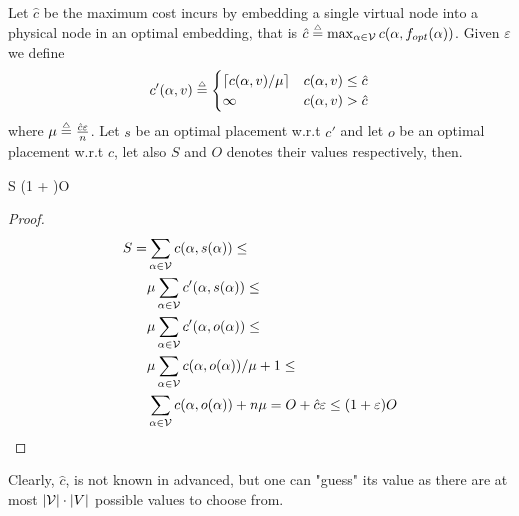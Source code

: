 Let $\hat{c}$ be the maximum cost incurs by embedding a single virtual node into 
a physical node in an optimal embedding, 
that is $\hat{c} \stackrel{\scriptscriptstyle \triangle}{=} \max_{\alpha \in \mathcal{V}}c(\alpha, f_{opt}(\alpha))$.
Given $\varepsilon$ we define 
$$
c'(\alpha, v) \stackrel{\scriptscriptstyle \triangle}{=}
\begin{cases}
\left\lceil {c(\alpha, v)/\mu} \right\rceil & c(\alpha, v) \leq \hat{c}
\\
\infty & c(\alpha, v) > \hat{c}
\end{cases}
$$
where 
$
\mu \stackrel{\scriptscriptstyle \triangle}{=} \frac{\hat{c}\varepsilon}{n}
$.
Let $s$ be an optimal placement w.r.t $c'$ 
and let $o$ be an optimal placement w.r.t $c$, 
let also $S$ and $O$ denotes their values respectively, then.
\begin{lemma}
S \leq (1 + \varepsilon)O
\end{lemma}
\begin{proof}
\begin{align*}
S = & \sum_{\alpha \in \mathcal{V}}c(\alpha, s(\alpha)) \leq
\\&
\mu\sum_{\alpha \in \mathcal{V}}c'(\alpha, s(\alpha)) \leq
\\&
\mu\sum_{\alpha \in \mathcal{V}}c'(\alpha, o(\alpha)) \leq
\\&
\mu\sum_{\alpha \in \mathcal{V}}c(\alpha, o(\alpha))/\mu + 1 \leq
\\&
\sum_{\alpha \in \mathcal{V}}c(\alpha, o(\alpha)) + n\mu =
O + \hat{c}\varepsilon \leq (1 + \varepsilon)O
\end{align*}
\end{proof}
Clearly, $\hat{c}$, is not known in advanced, but one can "guess" 
its value as there are at most
$|\mathcal{V}| \cdot |V|$ possible values to choose from.

